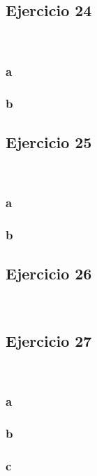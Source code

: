 \documentclass{article}
\begin{document}
\subsection*{Ejercicio 24}

\

\subsubsection*{a}

\subsubsection*{b}

\subsection*{Ejercicio 25}

\

\subsubsection*{a}

\subsubsection*{b}

\subsection*{Ejercicio 26}

\

\subsection*{Ejercicio 27}

\

\subsubsection*{a}

\subsubsection*{b}

\subsubsection*{c}
\end{document}
